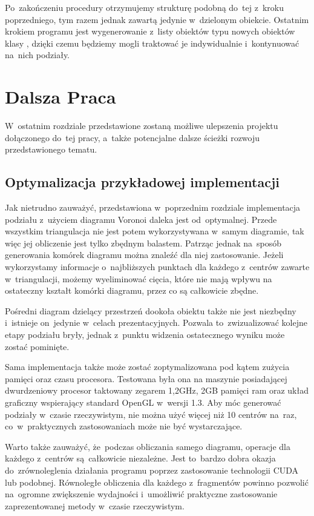\documentclass[skorowidz,autorrok,backref,xodstep,oswiadczenie]{wmimgr}
\begin{document}
Po~zakończeniu procedury otrzymujemy strukturę podobną do~tej z~kroku poprzedniego, tym razem jednak zawartą jedynie w~dzielonym obiekcie. Ostatnim krokiem programu jest wygenerowanie z~listy obiektów typu  nowych obiektów klasy , dzięki czemu będziemy mogli traktować je indywidualnie i~kontynuować na~nich podziały.

\chapter{Dalsza Praca}

W~ostatnim rozdziale przedstawione zostaną możliwe ulepszenia projektu dołączonego do~tej pracy, a~także potencjalne dalsze ścieżki rozwoju przedstawionego tematu.

\section{Optymalizacja przykładowej implementacji}

Jak nietrudno zauważyć, przedstawiona w~poprzednim rozdziale implementacja podziału z~użyciem diagramu Voronoi daleka jest od~optymalnej. Przede wszystkim triangulacja nie jest potem wykorzystywana w~samym diagramie, tak więc jej obliczenie jest tylko zbędnym balastem. Patrząc jednak na~sposób generowania komórek diagramu można znaleźć dla niej zastosowanie. Jeżeli wykorzystamy informacje o~najbliższych punktach dla każdego z~centrów zawarte w~triangulacji, możemy wyeliminować cięcia, które nie mają wpływu na ostateczny kształt komórki diagramu, przez co są całkowicie zbędne.

Pośredni diagram dzielący przestrzeń dookoła obiektu także nie jest niezbędny i~istnieje on~jedynie w~celach prezentacyjnych. Pozwala to~zwizualizować kolejne etapy podziału bryły, jednak z~punktu widzenia ostatecznego wyniku może zostać pominięte.

Sama implementacja także może zostać zoptymalizowana pod kątem zużycia pamięci oraz czasu procesora. Testowana była ona na maszynie posiadającej dwurdzeniowy procesor taktowany zegarem 1,2GHz, 2GB pamięci ram oraz układ graficzny wspierający standard OpenGL w~wersji 1.3. Aby móc generować podziały w~czasie rzeczywistym, nie można użyć więcej niż 10 centrów na~raz, co~w~praktycznych zastosowaniach może nie być wystarczające.

Warto także zauważyć, że~podczas obliczania samego diagramu, operacje dla każdego z~centrów są~całkowicie niezależne. Jest to~bardzo dobra okazja do~zrównoleglenia działania programu poprzez zastosowanie technologii CUDA lub podobnej. Równoległe obliczenia dla każdego z~fragmentów powinno pozwolić na~ogromne zwiększenie wydajności i~umożliwić praktyczne zastosowanie zaprezentowanej metody w~czasie rzeczywistym.
\end{document}
